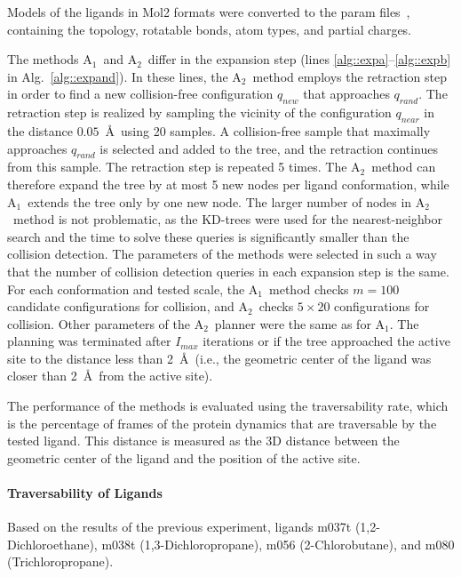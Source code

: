 \documentclass{bmcart}
\def\qrand{q_{rand}}
\def\qnear{q_{near}}
\def\qnew{q_{new}}
\def\Imax{I_{max}} %
\def\RA{A$_{1}$}
\def\RB{A$_{2}$}
\begin{document}
Models  of the ligands in Mol2 formats were converted to the param files~\cite{meiler2006rosettaligand}, containing the topology, rotatable bonds, atom types, and partial charges. 

The methods \RA\ and \RB\ differ in the expansion step (lines \ref{alg::expa}--\ref{alg::expb} in Alg.~\ref{alg::expand}).
In these lines, the \RB\ method employs the retraction step in order to find a new collision-free configuration $\qnew$ that approaches $\qrand$.
The retraction step is realized by sampling the vicinity of the configuration $\qnear$ in the distance $0.05$~\AA\ using 20 samples.
A collision-free sample that maximally approaches $\qrand$ is selected and added to the tree, and the retraction continues from this sample.
The retraction step is repeated 5 times.
The \RB\ method can therefore expand the tree by at most 5 new nodes per ligand conformation, while \RA\ extends the tree only by one new node.
The larger number of nodes in \RB\ method is not problematic, as the KD-trees were used for the nearest-neighbor search and the time to solve these queries is significantly smaller than the collision detection.
The parameters of the methods were selected in such a way that the number of collision detection queries in each expansion step is the same.
For each conformation and tested scale, the \RA\ method checks $m=100$ candidate configurations for collision, and \RB\ checks $5 \times 20$ configurations for collision.
Other parameters of the \RB\ planner were the same as for \RA.
The planning was terminated after $\Imax$ iterations or if the tree approached the active site to the distance less than 2~\AA\ (i.e., the 
geometric center of the ligand was closer than 2~\AA\ from the active site).

The performance of the methods is evaluated using the traversability rate, which is the percentage of frames of the protein dynamics that are traversable by the tested ligand.
This distance is measured as the 3D distance between the geometric center of the ligand and the position of the active site.



\paragraph*{Traversability of Ligands}
Based on the results of the previous experiment, 
      ligands 
m037t (1,2-Dichloroethane), m038t (1,3-Dichloropropane), m056 (2-Chlorobutane), and m080 (Trichloropropane).
\end{document}
